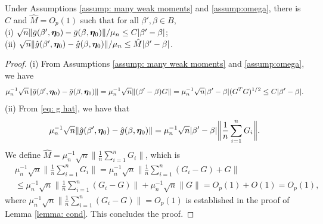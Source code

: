 \documentclass[12pt]{article}
\begin{document}
{\begin{lemma} \label{lemma: g bdd by beta}
Under Assumptions \ref{assump: many weak moments} and \ref{assump:omega}, there is $C$ and $\hat M=O_p(1)$ such that for all $\beta', \beta\in B$,\\
(i)   $\sqrt{n} \|\bar g(\beta', \bm \eta_0) - \bar g(\beta, \bm \eta_0)\|/\mu_n\leq C|\beta'-\beta|$;\\
(ii)  $\sqrt{n} \|\hat g(\beta', \bm \eta_0) - \hat g(\beta, \bm \eta_0)\|/\mu_n\leq \hat M |\beta'-\beta|$.
\end{lemma}
\begin{proof}
(i) From Assumptions \ref{assump: many weak moments} and  \ref{assump:omega}, we have 
\begin{align}
    \mu_n^{-1} \sqrt{n}\|\bar g(\beta', \bm \eta_0) - \bar g(\beta, \bm \eta_0) \| = \mu_n^{-1} \sqrt{n} \| (\beta'-\beta) G\|= \mu_n^{-1}\sqrt{n} |\beta'-\beta| (G^T G)^{1/2} \leq C|\beta'-\beta|. \nonumber
\end{align}
(ii) From \eqref{eq: g hat}, we have that 
\begin{align*}
    \mu_n^{-1} \sqrt{n} \|\hat g(\beta', \bm \eta_0) - \hat g(\beta, \bm \eta_0)\| = \mu_n^{-1} \sqrt{n} |\beta'-\beta| \bigg\|\frac{1}{n}\sum_{i=1}^n G_i\bigg\|.
\end{align*}
We  define $\hat M= \mu_n^{-1}\sqrt{n} \|\frac{1}{n}\sum_{i=1}^n G_i\|$, which is
\begin{align*}
 &\mu_n^{-1}\sqrt{n} \bigg\|\frac{1}{n}\sum_{i=1}^n G_i\bigg\| =  \mu_n^{-1}\sqrt{n} \bigg\|\frac{1}{n}\sum_{i=1}^n (G_i- G)+ G\bigg\| \\
 &\leq \mu_n^{-1} \sqrt{n}\bigg\|\frac{1}{n}\sum_{i=1}^n (G_i- G)\bigg\| + 
 \mu_n^{-1} \sqrt{n}\| G\| = O_p(1) + O(1)= O_p(1),
\end{align*}
where $\mu_n^{-1}\sqrt{n}\| \frac{1}{n}\sum_{i=1}^n (G_i- G)\|=O_p(1)$ is established in the proof of Lemma \ref{lemma: cond}. This concludes the proof. 
\end{proof}


}
\end{document}

